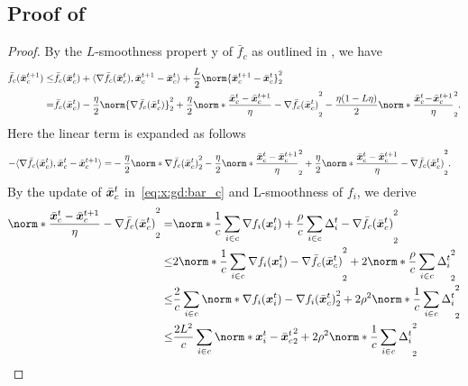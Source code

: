 \documentclass{article}
\begin{document}
\subsection{Proof of }\label{ssec:proof:sd:1}
\begin{proof}
  By the $L$-smoothness propert y of $\bar{f}_c$ as outlined in , we have
  \begin{align*}
    \bar{f}_c(\bar{\xx}_c^{t+1}) \le& \bar{f}_c(\bar{\xx}_c^t) + \langle\nabla \bar{f}_c(\bar{\xx}_c^t), \bar{\xx}_c^{t+1} - \bar{\xx}_c^t\rangle + \frac{L}{2}\norm{\bar{\xx}_c^{t+1} - \bar{\xx}_c^t}_2^2 \\
    =& \bar{f}_c(\bar{\xx}_c^t) - \frac{\eta}{2} \norm{\nabla \bar{f}_c(\bar{\xx}_c^t)}_2^2 + \frac{\eta}{2}\norm*{\frac{\bar{\xx}_c^{t} - \bar{\xx}_c^{t+1}}{\eta} - \nabla \bar{f}_c(\bar{\xx}_c^t)}_2^2 
    - \frac{\eta(1-L\eta)}{2} \norm*{\frac{\bar{\xx}_c^{t} \!-\!  \bar{\xx}_c^{t+1}}{\eta}}_2^2.
  \end{align*}
  Here the linear term is expanded as follows
  \begin{align*}
    - \langle\nabla \bar{f}_c(\bar{\xx}_c^t), \bar{\xx}_c^{t} - \bar{\xx}_c^{t+1}\rangle 
    =&- \frac{\eta}{2} \norm*{\nabla \bar{f}_c(\bar{\xx}_c^t)}_2^2 
    - \frac{\eta}{2} \norm*{\frac{\bar{\xx}_c^{t} - \bar{\xx}_c^{t+1}}{\eta}}_2^2 
    + \frac{\eta}{2} \norm*{\frac{\bar{\xx}_c^{t} - \bar{\xx}_c^{t+1}}{\eta} - \nabla \bar{f}_c(\bar{\xx}_c^{t})}_2^2.
  \end{align*}
  By the update of $\bar{\bm{x}}_c^t$ in~\eqref{eq:x:gd:bar_c} and L-smoothness of $f_i$, we derive
  \begin{align*}
    \norm*{\frac{\bar{\xx}_c^{t}-\bar{\xx}_c^{t+1}}{\eta} - \nabla \bar{f}_c(\bar{\xx}_c^{t})}_2^2
    =& \norm*{
      \frac{1}{c} \sum_{i\in c}  \nabla f_i(\xx^t_i)
      + \frac{\rho}{c}\sum_{i\in c} \Delta_i^t
     - \nabla \bar{f}_c(\bar{\xx}_c^t)}_2^2 \\
     \le& 2 \norm*{
      \frac{1}{c} \sum_{i\in c}  \nabla f_i(\xx^t_i)
     - \nabla \bar{f}_c(\bar{\xx}_c^t)}_2^2
     + 2 \norm*{\frac{\rho}{c}\sum_{i\in c} \Delta_i^t}_2^2 \\
     \le& \frac{2}{c} \sum_{i\in c} \norm*{\nabla f_i(\xx^t_i)
      - \nabla f_i(\bar{\xx}_c^t)}_2^2
     + 2\rho^2\norm*{\frac{1}{c}\sum_{i\in c} \Delta_i^t}_2^2 \\
     \le& \frac{2L^2}{c} \sum_{i\in c} \norm*{\xx^t_i
      - \bar{\xx}_c^t}_2^2
     + 2\rho^2\norm*{\frac{1}{c}\sum_{i\in c} \Delta_i^t}_2^2 \\

\end{align*}
\end{proof}
\end{document}
